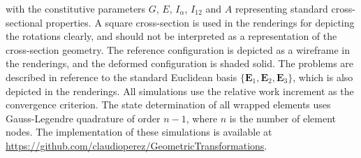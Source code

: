 with 
the constitutive %
parameters \(G\), \(E\), \(I_\alpha\), \(I_{12}\) and \(A\)
representing
standard cross-sectional properties.
A square cross-section is used in the renderings for depicting
the rotations clearly,
and should not be interpreted as a representation of the cross-section geometry.
The reference configuration is depicted as a wireframe in the renderings, and the deformed configuration is shaded solid.
The problems are described in reference to the standard Euclidean basis $\{\mathbf{E}_1, \mathbf{E}_2, \mathbf{E}_3\}$,
which is also depicted in the renderings. 
All simulations use the relative work increment as the convergence criterion. 
The state determination of all wrapped elements uses   
Gauss-Legendre quadrature of order \(n-1\), where $n$ is the number of element nodes. %
The implementation of these simulations is available at \url{https://github.com/claudioperez/GeometricTransformations}.

